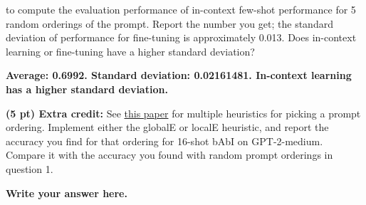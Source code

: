 \documentclass[12pt]{article}
\begin{document}
\begin{enumerate}
    to compute the evaluation performance of in-context few-shot performance for 5 random orderings of the prompt. Report the number you get; the standard deviation of performance for fine-tuning is approximately 0.013. Does in-context learning or fine-tuning have a higher standard deviation?
    
    \textbf{\color{red}Average: 0.6992. Standard deviation: 0.02161481. In-context learning has a higher standard deviation.}

    \textbf{(5 pt) Extra credit:} See \href{https://arxiv.org/pdf/2104.08786.pdf}{this paper} for multiple heuristics for picking a prompt ordering. Implement either the globalE or localE heuristic, and report the accuracy you find for that ordering for 16-shot bAbI on GPT-2-medium. Compare it with the accuracy you found with random prompt orderings in question 1.
    
    \textbf{\color{red}Write your answer here.}
\end{enumerate}
\end{document}
